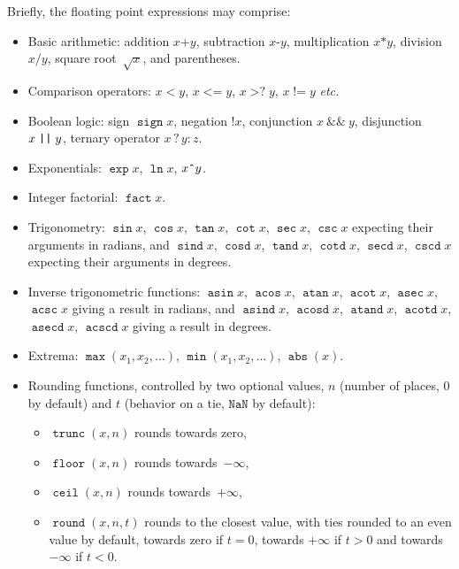 \documentclass{ltxguide}
\providecommand\fpop[1]{\mathop{\texttt{#1}}}
\providecommand\fpbin[1]{\mathbin{\texttt{#1}}}
\providecommand\fprel[1]{\mathrel{\texttt{#1}}}
\providecommand\nan{\texttt{NaN}}
\begin{document}
Briefly, the floating point expressions may comprise:
\begin{itemize}
  \item Basic arithmetic: addition $x\fpbin{+}y$, subtraction $x\fpbin{-}y$,
    multiplication $x\fpbin{*}y$, division $x\fpbin{/}y$, square root~$\sqrt{x}$,
    and parentheses.
  \item Comparison operators: $x\fprel{<}y$,
    $x\fprel{<=}y$, $x\fprel{>?}y$,
    $x\fprel{!=}y$ \emph{etc.}
  \item Boolean logic: sign $\fpop{sign} x$,
    negation $\fpop{!}x$, conjunction
    $x\fprel{\&\&}y$, disjunction $x\fprel{\string|\string|}y$, ternary
    operator $x\fprel{?}y\fprel{:}z$.
  \item Exponentials: $\fpop{exp} x$, $\fpop{ln} x$, $x\mathord{\texttt{\^{}}}y$.
  \item Integer factorial: $\fpop{fact} x$.
  \item Trigonometry: $\fpop{sin} x$, $\fpop{cos} x$, $\fpop{tan} x$, $\fpop{cot} x$, $\fpop{sec}
    x$, $\fpop{csc} x$ expecting their arguments in radians, and
    $\fpop{sind} x$, $\fpop{cosd} x$,
    $\fpop{tand} x$, $\fpop{cotd} x$,
    $\fpop{secd} x$, $\fpop{cscd} x$ expecting their
    arguments in degrees.
  \item Inverse trigonometric functions: $\fpop{asin} x$,
    $\fpop{acos} x$, $\fpop{atan} x$,
    $\fpop{acot} x$, $\fpop{asec} x$,
    $\fpop{acsc} x$ giving a result in radians, and
    $\fpop{asind} x$, $\fpop{acosd} x$,
    $\fpop{atand} x$, $\fpop{acotd} x$,
    $\fpop{asecd} x$, $\fpop{acscd} x$ giving a result
    in degrees.
  \item Extrema: $\fpop{max}(x_{1},x_{2},\ldots)$, $\fpop{min}(x_{1},x_{2},\ldots)$,
    $\fpop{abs}(x)$.
  \item Rounding functions, controlled by two optional
    values,  $n$ (number of places, $0$ by default) and
      $t$ (behavior on a tie, $\nan$ by default):
    \begin{itemize}
    \item $\fpop{trunc}(x,n)$ rounds towards zero,
    \item $\fpop{floor}(x,n)$ rounds towards~$-\infty$,
    \item $\fpop{ceil}(x,n)$ rounds towards~$+\infty$,
    \item $\fpop{round}(x,n,t)$ rounds to the closest value, with
    ties rounded to an even value by default, towards zero if $t=0$,
    towards $+\infty$ if $t>0$ and towards $-\infty$ if $t<0$.
    \end{itemize}

\end{itemize}
\end{document}
